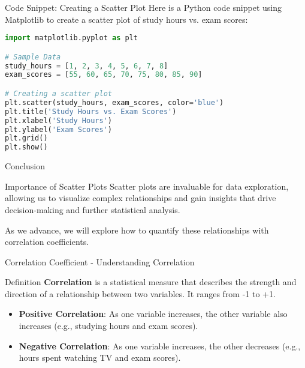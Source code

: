 \documentclass[aspectratio=169]{beamer}
\begin{document}
\begin{frame}[fragile]{Code Snippet: Creating a Scatter Plot}
    Here is a Python code snippet using Matplotlib to create a scatter plot of study hours vs. exam scores:
    \begin{lstlisting}[language=Python]
import matplotlib.pyplot as plt

# Sample Data
study_hours = [1, 2, 3, 4, 5, 6, 7, 8]
exam_scores = [55, 60, 65, 70, 75, 80, 85, 90]

# Creating a scatter plot
plt.scatter(study_hours, exam_scores, color='blue')
plt.title('Study Hours vs. Exam Scores')
plt.xlabel('Study Hours')
plt.ylabel('Exam Scores')
plt.grid()
plt.show()
    \end{lstlisting}
\end{frame}

\begin{frame}[fragile]{Conclusion}
    \begin{block}{Importance of Scatter Plots}
        Scatter plots are invaluable for data exploration, allowing us to visualize complex relationships and gain insights that drive decision-making and further statistical analysis.
    \end{block}

    As we advance, we will explore how to quantify these relationships with correlation coefficients.
\end{frame}

\begin{frame}[fragile]{Correlation Coefficient - Understanding Correlation}
    \begin{block}{Definition}
        \textbf{Correlation} is a statistical measure that describes the strength and direction of a relationship between two variables. It ranges from -1 to +1.
    \end{block}
    
    \begin{itemize}
        \item \textbf{Positive Correlation}: As one variable increases, the other variable also increases (e.g., studying hours and exam scores).
        \item \textbf{Negative Correlation}: As one variable increases, the other decreases (e.g., hours spent watching TV and exam scores).
    \end{itemize}
\end{frame}
\end{document}
